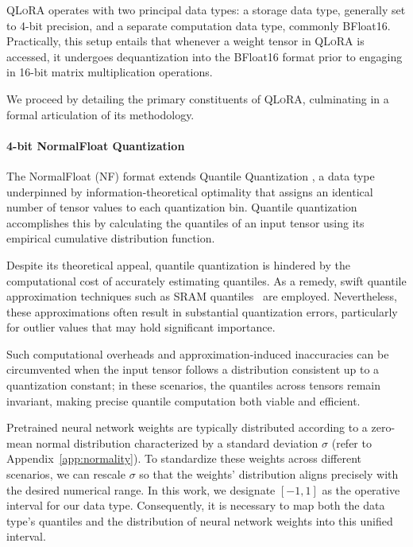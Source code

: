 \textsc{QLoRA} operates with two principal data types: a storage data type, generally set to 4-bit precision, and a separate computation data type, commonly BFloat16. Practically, this setup entails that whenever a weight tensor in \textsc{QLoRA} is accessed, it undergoes dequantization into the BFloat16 format prior to engaging in 16-bit matrix multiplication operations.

We proceed by detailing the primary constituents of \textsc{QLoRA}, culminating in a formal articulation of its methodology.

\paragraph{4-bit NormalFloat Quantization} The NormalFloat (NF) format extends Quantile Quantization \citep{dettmers2022optimizers}, a data type underpinned by information-theoretical optimality that assigns an identical number of tensor values to each quantization bin. Quantile quantization accomplishes this by calculating the quantiles of an input tensor using its empirical cumulative distribution function.

Despite its theoretical appeal, quantile quantization is hindered by the computational cost of accurately estimating quantiles. As a remedy, swift quantile approximation techniques such as SRAM quantiles~\citep{dettmers2022optimizers} are employed. Nevertheless, these approximations often result in substantial quantization errors, particularly for outlier values that may hold significant importance.

Such computational overheads and approximation-induced inaccuracies can be circumvented when the input tensor follows a distribution consistent up to a quantization constant; in these scenarios, the quantiles across tensors remain invariant, making precise quantile computation both viable and efficient.

Pretrained neural network weights are typically distributed according to a zero-mean normal distribution characterized by a standard deviation $\sigma$ (refer to Appendix~\ref{app:normality}). To standardize these weights across different scenarios, we can rescale $\sigma$ so that the weights' distribution aligns precisely with the desired numerical range. In this work, we designate $[-1, 1]$ as the operative interval for our data type. Consequently, it is necessary to map both the data type’s quantiles and the distribution of neural network weights into this unified interval.

